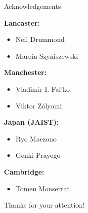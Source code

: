 \documentclass[10pt, pdf, hyperref={draft}, usenames, dvipsnames]{beamer}
\begin{document}
\begin{frame}{Acknowledgements}

\begin{minipage}[t]{0.45\textwidth}
{\bf Lancaster:}
\begin{itemize}
  \item Neil Drummond
  \item Marcin Szyniszewski
\end{itemize}
\vspace{0.5cm}
{\bf Manchester:}
\begin{itemize}
  \item Vladimir I. Fal'ko
  \item Viktor Z\'{o}lyomi
\end{itemize}
\end{minipage}%
\hfill
\begin{minipage}[t]{0.45\textwidth}
{\bf Japan (JAIST):}
\begin{itemize}
  \item Ryo Maezono
  \item Genki Prayogo
\end{itemize}
\vspace{0.5cm}
{\bf Cambridge:}
\begin{itemize}
  \item Tomeu Monserrat
\end{itemize}
\end{minipage}%
\vfill
\begin{center}
{\Large Thanks for your attention!}
\end{center}
\end{frame}



\end{document}
